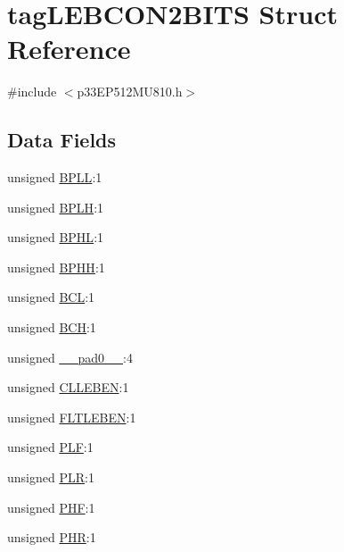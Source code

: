 \hypertarget{structtag_l_e_b_c_o_n2_b_i_t_s}{}\section{tag\+L\+E\+B\+C\+O\+N2\+B\+I\+TS Struct Reference}
\label{structtag_l_e_b_c_o_n2_b_i_t_s}


{\ttfamily \#include $<$p33\+E\+P512\+M\+U810.\+h$>$}

\subsection*{Data Fields}
\begin{DoxyCompactItemize}
\item 
unsigned \hyperlink{structtag_l_e_b_c_o_n2_b_i_t_s_a734b807d032fa494468c04783b84279d}{B\+P\+LL}\+:1
\item 
unsigned \hyperlink{structtag_l_e_b_c_o_n2_b_i_t_s_ab92bd28ed3161199870cae9dca9d8264}{B\+P\+LH}\+:1
\item 
unsigned \hyperlink{structtag_l_e_b_c_o_n2_b_i_t_s_ab1b78e048d280a836358a465b1670e7a}{B\+P\+HL}\+:1
\item 
unsigned \hyperlink{structtag_l_e_b_c_o_n2_b_i_t_s_a8fd804263987e931f779f124751138e1}{B\+P\+HH}\+:1
\item 
unsigned \hyperlink{structtag_l_e_b_c_o_n2_b_i_t_s_acead45594aa9d4a55a37f37fdcc3f0a0}{B\+CL}\+:1
\item 
unsigned \hyperlink{structtag_l_e_b_c_o_n2_b_i_t_s_a485d688549b456635ec3ac860ad7cdaf}{B\+CH}\+:1
\item 
unsigned \hyperlink{structtag_l_e_b_c_o_n2_b_i_t_s_adf71f3d8410c1f1dbbc96680a92c49af}{\+\_\+\+\_\+pad0\+\_\+\+\_\+}\+:4
\item 
unsigned \hyperlink{structtag_l_e_b_c_o_n2_b_i_t_s_a4ec62ac7ec38a6cf1ca2276db69912a9}{C\+L\+L\+E\+B\+EN}\+:1
\item 
unsigned \hyperlink{structtag_l_e_b_c_o_n2_b_i_t_s_aa96ca2430a7a6200927f390d1aa0b21a}{F\+L\+T\+L\+E\+B\+EN}\+:1
\item 
unsigned \hyperlink{structtag_l_e_b_c_o_n2_b_i_t_s_ab72be8b35e01107182afb8e9733d72bb}{P\+LF}\+:1
\item 
unsigned \hyperlink{structtag_l_e_b_c_o_n2_b_i_t_s_a5f690459b53fc81b46dbbac226cecb25}{P\+LR}\+:1
\item 
unsigned \hyperlink{structtag_l_e_b_c_o_n2_b_i_t_s_a4ac425e6c1575269dfa33a0373584fff}{P\+HF}\+:1
\item 
unsigned \hyperlink{structtag_l_e_b_c_o_n2_b_i_t_s_ae02a9c6926c3a1feac21cec18a520e4a}{P\+HR}\+:1
\end{DoxyCompactItemize}


